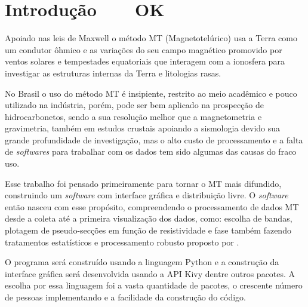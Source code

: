 

\chapter{Introdução \,\,\,\,\,\,\,\,\ OK}
    \label{cap-introducao}
    
	Apoiado nas leis de Maxwell o método MT (Magnetotelúrico) usa a Terra como 
	um condutor ôhmico e as variações do seu campo 
	magnético promovido por ventos solares \cite{parkinson93} e tempestades equatoriais 
	que interagem com a ionosfera para investigar as 
	estruturas internas da Terra e litologias rasas. 
	
	
	No Brasil o uso do método MT é insipiente, restrito ao meio acadêmico e pouco
	utilizado na indústria, porém, pode ser bem aplicado na prospecção de 
	hidrocarbonetos, sendo a sua resolução melhor que a magnetometria
	e gravimetria, também em estudos crustais
	apoiando a sismologia devido sua grande profundidade de investigação, mas o 
	alto custo de processamento e a falta de \textit{softwares} para trabalhar com os 
	dados tem sido algumas das causas do fraco uso.
	
	
	Esse trabalho foi pensado primeiramente para tornar o MT mais difundido, 
	construindo um \textit{software} com interface gráfica e 
	distribuição livre. O \textit{software} então nasceu 
	com esse propósito, compreendendo o processamento de dados
	MT desde a coleta até a primeira visualização dos dados, como: escolha 
	de bandas, plotagem de pseudo-secções em função de resistividade e fase 
	também fazendo tratamentos estatísticos e processamento robusto 
	proposto por \citeauthor{egbert97} \citeyearpar{egbert97}.
	
	
	O programa será construído usando a linguagem Python \cite{python36} 
	e a construção da interface gráfica será desenvolvida usando a API
	Kivy \cite{kivy110} dentre outros pacotes. A escolha por essa linguagem foi a vasta quantidade de pacotes,  o crescente 
	número de pessoas implementando e a facilidade da construção do código.



